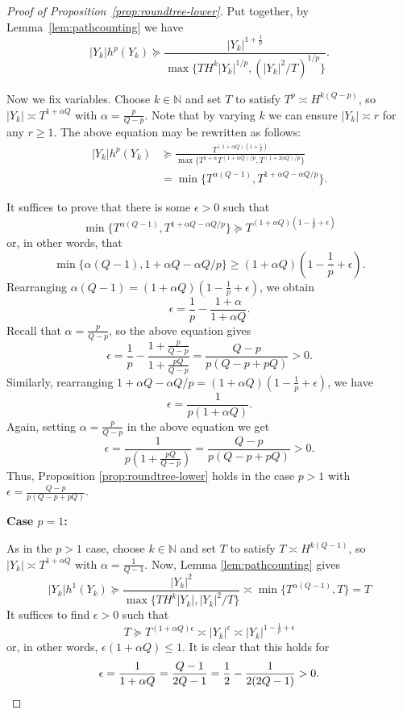 \documentclass[11pt]{amsart}
\numberwithin{equation}{section}
\theoremstyle{citing}
\newcommand{\N}{\mathbb{N}}
\numberwithin{equation}{section}
\begin{document}
\begin{proof}[Proof of Proposition~\ref{prop:roundtree-lower}]
	Put together, by Lemma~\ref{lem:pathcounting} we have
	\begin{equation*}
		|Y_k| h^{p}(Y_k)  \succeq \frac{|Y_k|^{1+\frac{1}{p}}}{ \max\{ TH^k |Y_k|^{1/p}, (|Y_k|^2/T)^{1/p} \} }.
	\end{equation*}

	Now we fix variables. Choose $k\in\N$ and set $T$ to satisfy $T^p\asymp H^{k(Q-p)}$, so $|Y_k|\asymp T^{1+\alpha Q}$ with $\alpha=\frac{p}{Q-p}$.  Note that by varying $k$ we can ensure $|Y_k| \asymp r$ for any $r\geq 1$.  The above equation may be rewritten as follows:
    \begin{align*}
		|Y_k| h^{p}(Y_k)   & \succeq \frac{T^{(1+\alpha Q)(1+\frac1p)}}{\max\{T^{1+\alpha}T^{(1+\alpha Q)/p},T^{(1+2\alpha Q)/p}\}}  \\ & = \min\{T^{\alpha(Q-1)},T^{1+\alpha Q-\alpha Q/p}\}.
	\end{align*}

    It suffices to prove that there is some $\epsilon>0$ such that 
    \[
        \min\{T^{\alpha(Q-1)},T^{1+\alpha Q-\alpha Q/p}\} \succeq T^{(1+\alpha Q)(1-\frac1p+\epsilon)}
    \]
    or, in other words, that
    \[
        \min\{\alpha(Q-1),1+\alpha Q-\alpha Q/p\} \geq (1+\alpha Q)(1-\frac1p+\epsilon).
    \]
    Rearranging $\alpha(Q-1)= (1+\alpha Q)(1-\frac1p+\epsilon)$, we obtain
    \[
     \epsilon = \frac{1}{p}-\frac{1+\alpha}{1+\alpha Q}.
    \]
    Recall that $\alpha=\frac{p}{Q-p}$, so the above equation gives
    \[
    \epsilon = \frac{1}{p} - \frac{1+\frac{p}{Q-p}}{1+\frac{pQ}{Q-p}} = \frac{Q-p}{p(Q-p+pQ)}>0.
    \]
    Similarly, rearranging $1+\alpha Q-\alpha Q/p = (1+\alpha Q)(1-\frac1p+\epsilon)$, we have
    \[
    \epsilon = \frac{1}{p(1+\alpha Q)}.
    \]
    Again, setting $\alpha=\frac{p}{Q-p}$ in the above equation we get
    \[
    \epsilon = \frac{1}{p\left(1+\frac{pQ}{Q-p}
    \right)} = \frac{Q-p}{p(Q-p+pQ)}>0.
    \]
    Thus, Proposition \ref{prop:roundtree-lower} holds in the case $p>1$ with $\epsilon= \frac{Q-p}{p(Q-p+pQ)}$.
    

\smallskip\noindent\textbf{Case $p=1$:}

	As in the $p>1$ case, choose $k\in\N$ and set $T$ to satisfy $T \asymp H^{k(Q-1)}$, so $|Y_k|\asymp T^{1+\alpha Q}$ with $\alpha=\frac1{Q-1}$. Now, Lemma \ref{lem:pathcounting} gives
	\[
		|Y_k|h^1(Y_k) \succeq \frac{|Y_k|^2 }{\max\{TH^k |Y_k|, |Y_k|^2/T\}}
		\asymp \min\{T^{\alpha(Q-1)},T\} = T
	\]
	It suffices to find $\epsilon>0$ such that 
    \[
        T\succeq T^{(1+\alpha Q)\epsilon}\asymp |Y_k|^\epsilon \asymp |Y_k|^{1-\frac1p+\epsilon}
    \]
    or, in other words, $\epsilon(1+\alpha Q)\leq 1$. It is clear that this holds for 
    \[
		\epsilon= \frac1{1+\alpha Q} = \frac{Q-1}{2Q-1} = \frac12 - \frac{1}{2(2Q-1)}>0.\qedhere
    \]
\end{proof}
\end{document}
